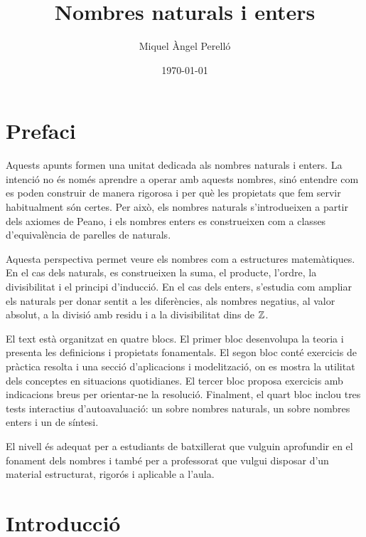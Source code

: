 \documentclass[12pt,a4paper,oneside]{book}
\begin{document}
\pagecolor{fons!20}

\frontmatter
\title{Nombres naturals i enters}
\author{Miquel Àngel Perelló}
\date{\today}
\maketitle
\tableofcontents


\let\cleardoublepage\clearpage

\chapter*{Prefaci}

Aquests apunts formen una unitat dedicada als nombres naturals i enters. La intenció no és només aprendre a operar amb aquests nombres, sinó entendre com es poden construir de manera rigorosa i per què les propietats que fem servir habitualment són certes. Per això, els nombres naturals s'introdueixen a partir dels axiomes de Peano, i els nombres enters es construeixen com a classes d'equivalència de parelles de naturals.

Aquesta perspectiva permet veure els nombres com a estructures matemàtiques. En el cas dels naturals, es construeixen la suma, el producte, l'ordre, la divisibilitat i el principi d'inducció. En el cas dels enters, s'estudia com ampliar els naturals per donar sentit a les diferències, als nombres negatius, al valor absolut, a la divisió amb residu i a la divisibilitat dins de \(\mathbb{Z}\).

El text està organitzat en quatre blocs. El primer bloc desenvolupa la teoria i presenta les definicions i propietats fonamentals. El segon bloc conté exercicis de pràctica resolta i una secció d'aplicacions i modelització, on es mostra la utilitat dels conceptes en situacions quotidianes. El tercer bloc proposa exercicis amb indicacions breus per orientar-ne la resolució. Finalment, el quart bloc inclou tres tests interactius d'autoavaluació: un sobre nombres naturals, un sobre nombres enters i un de síntesi.

El nivell és adequat per a estudiants de batxillerat que vulguin aprofundir en el fonament dels nombres i també per a professorat que vulgui disposar d'un material estructurat, rigorós i aplicable a l'aula.


\chapter{Introducció}
\end{document}
